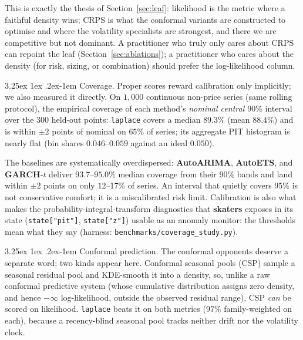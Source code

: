\documentclass[article]{jss}
\makeatletter
\renewcommand\paragraph{\@startsection{paragraph}{4}{\z@}%
  {3.25ex \@plus1ex \@minus.2ex}{-1em}%
  {\normalfont\normalsize\itshape}}
\providecommand{\pkg}[1]{\textbf{#1}}
\providecommand{\code}[1]{\texttt{#1}}
\makeatother
\begin{document}
This is
exactly the thesis of Section~\ref{sec:leaf}: likelihood is the metric where a
faithful density wins; CRPS is what the conformal variants are constructed to
optimise and where the volatility specialists are strongest, and there we are
competitive but not dominant. A practitioner who truly only cares about CRPS
can repoint the leaf (Section~\ref{sec:ablations}); a practitioner who cares about
the density (for risk, sizing, or combination) should prefer the
log-likelihood column.

\paragraph{Coverage.}
Proper scores reward calibration only implicitly; we also measured it directly.
On $1{,}000$ continuous non-price series (same rolling protocol), the empirical
coverage of each method's \emph{nominal central $90\%$} interval over the
$300$ held-out points: \code{laplace} covers a median $89.3\%$ (mean $88.4\%$)
and is within $\pm2$ points of nominal on $65\%$ of series; its aggregate
PIT histogram is nearly flat (bin shares $0.046$--$0.059$ against an ideal
$0.050$).

The baselines are systematically overdispersed: \pkg{AutoARIMA},
\pkg{AutoETS}, and \pkg{GARCH}-$t$ deliver $93.7$--$95.0\%$ median coverage
from their $90\%$ bands and land within $\pm2$ points on only $12$--$17\%$ of
series. An interval that quietly covers $95\%$ is not conservative comfort; it
is a miscalibrated risk limit. Calibration is also what makes the
probability-integral-transform diagnostics that \pkg{skaters} exposes in its
state (\code{state["pit"]}, \code{state["z"]}) usable as an anomaly monitor:
the thresholds mean what they say
(harness: \code{benchmarks/coverage\_study.py}).

\paragraph{Conformal prediction.}
The conformal opponents deserve a separate word; two kinds appear here. Conformal
seasonal pools (CSP) sample a seasonal residual pool and KDE-smooth it into a
density, so, unlike a raw conformal predictive system (whose cumulative
distribution assigns zero density, and hence $-\infty$ log-likelihood, outside the
observed residual range), CSP \emph{can} be scored on likelihood. \code{laplace}
beats it on both metrics ($97\%$ family-weighted on each), because a recency-blind
seasonal pool tracks neither drift nor the volatility clock.
\end{document}
